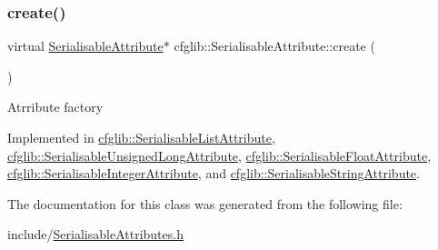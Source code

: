 \subsubsection{\texorpdfstring{create()}{create()}}
{\footnotesize\ttfamily virtual \hyperlink{classcfglib_1_1SerialisableAttribute}{Serialisable\+Attribute}$\ast$ cfglib\+::\+Serialisable\+Attribute\+::create (\begin{DoxyParamCaption}{ }\end{DoxyParamCaption})\hspace{0.3cm}{\ttfamily [pure virtual]}}

Atrribute factory 

Implemented in \hyperlink{classcfglib_1_1SerialisableListAttribute_a00e99bbe0a913edc157e027f9ba9b8f0}{cfglib\+::\+Serialisable\+List\+Attribute}, \hyperlink{classcfglib_1_1SerialisableUnsignedLongAttribute_a394a14fb12e3e0e11f37bf8e625f4901}{cfglib\+::\+Serialisable\+Unsigned\+Long\+Attribute}, \hyperlink{classcfglib_1_1SerialisableFloatAttribute_a47205df866697eb0af48be24f1a0fe5b}{cfglib\+::\+Serialisable\+Float\+Attribute}, \hyperlink{classcfglib_1_1SerialisableIntegerAttribute_ae8b6996fa450b48c0ca1eb79cba008c2}{cfglib\+::\+Serialisable\+Integer\+Attribute}, and \hyperlink{classcfglib_1_1SerialisableStringAttribute_aa9235315d09c87b3ac945ddde53fe85c}{cfglib\+::\+Serialisable\+String\+Attribute}.



The documentation for this class was generated from the following file\+:\begin{DoxyCompactItemize}
\item 
include/\hyperlink{SerialisableAttributes_8h}{Serialisable\+Attributes.\+h}\end{DoxyCompactItemize}
